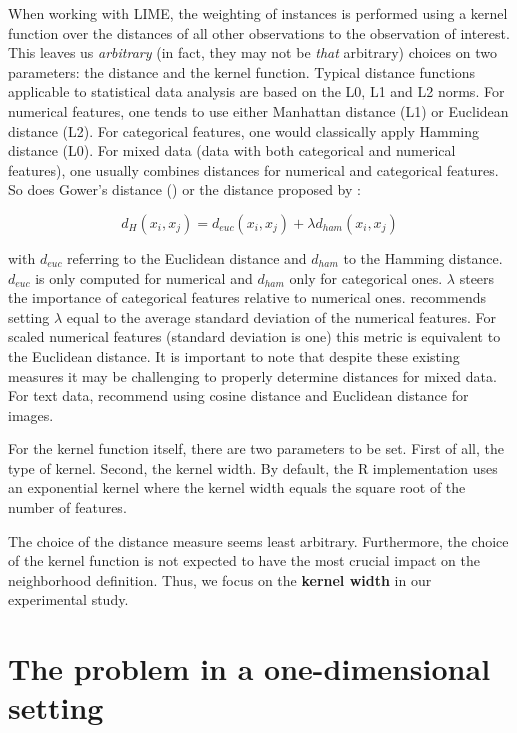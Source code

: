 \documentclass[]{krantz}
\begin{document}
When working with LIME, the weighting of instances is performed using a
kernel function over the distances of all other observations to the
observation of interest. This leaves us \emph{arbitrary} (in fact, they
may not be \emph{that} arbitrary) choices on two parameters: the
distance and the kernel function. Typical distance functions applicable
to statistical data analysis are based on the L0, L1 and L2 norms. For
numerical features, one tends to use either Manhattan distance (L1) or
Euclidean distance (L2). For categorical features, one would classically
apply Hamming distance (L0). For mixed data (data with both categorical
and numerical features), one usually combines distances for numerical
and categorical features. So does Gower's distance
(\citet{gower1971general}) or the distance proposed by
\citet{huang1998kproto}:

\[ d_H(x_i, x_j) = d_{euc}(x_i, x_j) + \lambda d_{ham}(x_i, x_j) \]

with \(d_{euc}\) referring to the Euclidean distance and \(d_{ham}\) to
the Hamming distance. \(d_{euc}\) is only computed for numerical and
\(d_{ham}\) only for categorical ones. \(\lambda\) steers the importance
of categorical features relative to numerical ones.
\citet{huang1998kproto} recommends setting \(\lambda\) equal to the
average standard deviation of the numerical features. For scaled
numerical features (standard deviation is one) this metric is equivalent
to the Euclidean distance. It is important to note that despite these
existing measures it may be challenging to properly determine distances
for mixed data. For text data, \citet{ribeiro2016should} recommend using
cosine distance and Euclidean distance for images.

For the kernel function itself, there are two parameters to be set.
First of all, the type of kernel. Second, the kernel width. By default,
the R implementation uses an exponential kernel where the kernel width
equals the square root of the number of features.

The choice of the distance measure seems least arbitrary. Furthermore,
the choice of the kernel function is not expected to have the most
crucial impact on the neighborhood definition. Thus, we focus on the
\textbf{kernel width} in our experimental study.

\section{The problem in a one-dimensional setting}\label{id3}
\end{document}
